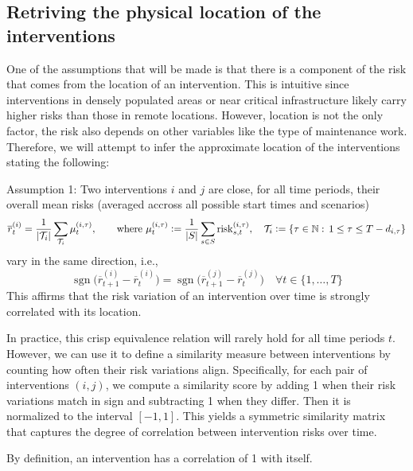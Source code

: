 \subsection{Retriving the physical location of the interventions}
One of the assumptions that will be made is that there is a component of the risk that comes from the location of an intervention. This is intuitive since interventions in densely populated areas or near critical infrastructure likely carry higher risks than those in remote locations. However, location is not the only factor, the risk also depends on other variables like the type of maintenance work. \\

Therefore, we will attempt to infer the approximate location of the interventions stating the following:
\begin{notation}{Assumption 1:}
    Two interventions \(i\) and \(j\) are close, for all time periods, their overall mean risks (averaged accross all possible start times and scenarios)
    \[
    \overline{r}_t^{(i)} = \frac{1}{\left|\mathcal{T}_i\right|}\sum_{\mathcal{T}_i}\mu_t^{(i,\tau)}, 
    \qquad \text{where }\mu_t^{(i,\tau)} \mathrel{\mathop:}= \frac{1}{|S|}\sum_{s\in S} \mathrm{risk}_{s,t}^{(i,\tau)}, \quad
    \mathcal{T}_i\mathrel{\mathop:}= \{\tau\in \mathbb{N}:\,1\leq \tau \leq T-d_{i,\tau}\}
    \]
    vary in the same direction, i.e.,
    \[
    \operatorname{sgn}\Big(\overline{r}_{t+1}^{(i)}-\overline{r}_t^{(i)}\Big)=\operatorname{sgn}\Big(\overline{r}_{t+1}^{(j)}-\overline{r}_t^{(j)}\Big)\quad\forall t\in\{1,\dots , T\}
    \]
    This affirms that the risk variation of an intervention over time is strongly correlated with its location.
    \end{notation}


In practice, this crisp equivalence relation will rarely hold for all time periods $t$. However, we can use it to define a similarity measure between interventions by counting how often their risk variations align. Specifically, for each pair of interventions $(i,j)$, we compute a similarity score by adding 1 when their risk variations match in sign and subtracting 1 when they differ. Then it is normalized to the interval $[-1,1]$. This yields a symmetric similarity matrix that captures the degree of correlation between intervention risks over time.

\begin{remark}
    By definition, an intervention has a correlation of 1 with itself.
\end{remark}


